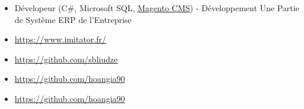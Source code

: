 \documentclass[10pt,a4paper,ragged2e]{altacv}
\begin{document}
	\divider
	
	\begin{itemize}
		\item Dévelopeur (C\#, Microsoft SQL, \href{https://magento.com/}{Magento CMS}) - Développement Une Partie de Système ERP de l'Entreprise
	\end{itemize}
	
	\clearpage
	
	
	
	{}{}
	\begin{itemize}
		\item \href{IMITATOR}{https://www.imitator.fr/}
	\end{itemize}
	
	\divider
	
	{}{}
	\begin{itemize}
		\item \href{https://github.com/sbliudze}{https://github.com/sbliudze}
		\item \href{https://github.com/hoangia90}{https://github.com/hoangia90}
	\end{itemize}

	\divider
	
	{}{}
	\begin{itemize}
		\item \href{https://github.com/hoangia90}{https://github.com/hoangia90}
	\end{itemize}
	
	
	
	
	\nocite{*}
	
%	
%	
%	
%	
	
\end{document}
